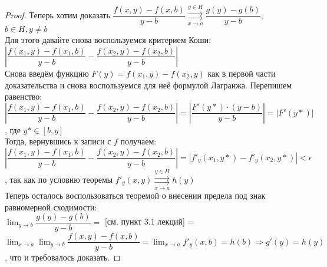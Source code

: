 \begin{proof}
    Теперь хотим доказать $\dfrac{f(x, y) - f(x, b)}{y - b} \overset{y \in H}{\underset{x \to a}{\rightrightarrows}}
    \dfrac{g(y) - g(b)}{y - b}$, $b \in H, y \neq b$ \\
    Для этого давайте снова воспользуемся критерием Коши: \\
    $\left|\dfrac{f(x_1, y) - f(x_1, b)}{y - b} - \dfrac{f(x_2, y) - f(x_2, b)}{y - b}\right|$ \\
    Снова введём функцию $F(y) = f(x_1, y) - f(x_2, y)$ как в первой части доказательства и снова воспользуемся для 
    неё формулой Лагранжа. Перепишем равенство: \\
    $\left|\dfrac{f(x_1, y) - f(x_1, b)}{y - b} - \dfrac{f(x_2, y) - f(x_2, b)}{y - b}\right| =
    \left|\dfrac{F'(y*) \cdot (y - b)}{y - b}\right| = |F'(y*)| $, где $y* \in [b, y]$ \\
    Тогда, вернувшись к записи с $f$ получаем: \\
    $\left|\dfrac{f(x_1, y) - f(x_1, b)}{y - b} - \dfrac{f(x_2, y) - f(x_2, b)}{y - b}\right| =
    |f'_y(x_1, y*) - f'_y(x_2, y*)| < \epsilon$, так как по условию теоремы
    $f'_y(x, y) \overset{y \in H}{\underset{x \to a}{\rightrightarrows}} h(y)$ \\
    
    Теперь осталось воспользоваться теоремой о внесении предела под знак равномерной сходимости: \\
    $\lim_{y \to b} \dfrac{g(y) - g(b)}{y - b} =$ [см. пункт 3.1 лекций] = 
    $\lim_{x \to a} \lim_{y \to b} \dfrac{f(x, y) - f(x, b)}{y - b} = 
    \lim_{x \to a} f'_y(x, b) = h(b) \Rightarrow g'(y) = h(y)$, что и требовалось доказать.
\end{proof}
